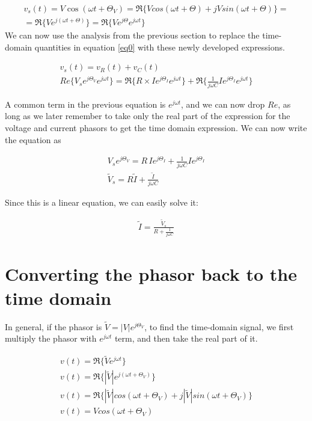 \documentclass{ximera}
\begin{document}
\begin{eqnarray}
v_s(t)=  V \cos (\omega t + \Theta_V)=\Re\{ V cos (\omega t + \Theta ) + j V sin (\omega t + \Theta)\}= \nonumber \\ 
= \Re\{V e^{j(\omega t + \Theta)}\}=\Re\{V e^{j \Theta} e^{j \omega t}\} \label{eq2}
\end{eqnarray}
We can now use the analysis from the previous section to  replace the time-domain quantities in equation \ref{eq0} with
these newly developed expressions.



\begin{eqnarray}
v_s(t)=v_R(t) + v_C(t)  \\
Re\{V_s e^{j \Theta_V} e^{j \omega t}\}=    \Re\{R \times I e^{j \Theta_I} e^{j \omega t}\}   +  \Re\{   \frac{1}{j \omega C}  I e^{j \Theta_I}  e^{j \omega t}  \}
\end{eqnarray}

A common term in the previous equation is $ e^{j\omega t}$, and we can now drop $Re$, as long as we later remember to take only the real part of the expression for the voltage and current phasors to get the time domain expression. We can now
write the equation as




\begin{eqnarray}
 V_s  e^{j \Theta_{V}}  =R \, I e^{j \Theta_I}  +    \frac{1}{j \omega C}  I e^{j \Theta_I}  \\
\tilde{V}_s  = R \tilde{I}    + \frac{\tilde{I}}{j \omega C} 
\end{eqnarray}



Since this is a linear equation, we can easily solve it:


\begin{eqnarray}
\tilde{I}  = \frac{\tilde{V}_s}{ R    + \frac{1}{j \omega C} } \label{pheq}
\end{eqnarray} 




\section{Converting the phasor back to the time domain}


In general, if the phasor is  $\tilde{V}=|V| e^{j \Theta_V}$, to find the time-domain signal, we first multiply the phasor with $e^{j \omega t}$ term, and then take the real part of it. 

\begin{eqnarray}
v(t)=\Re \{ \tilde{V} e^{j \omega t} \} \\
v(t)=\Re\{|\tilde{V}| e^{j(\omega t + \Theta_V)}\} \\
v(t)=\Re\{ |\tilde{V}| cos (\omega t + \Theta_V ) + j  |\tilde{V}|  sin (\omega t + \Theta_V)\} \\
v(t) = V cos (\omega t + \Theta_V )
\end{eqnarray}
\end{document}
